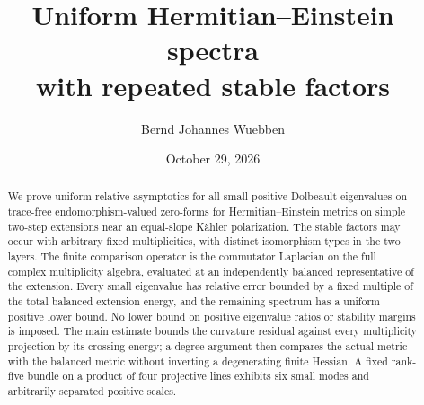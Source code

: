 \documentclass[11pt]{amsart}
\title[HE spectra with repeated stable factors]{Uniform Hermitian--Einstein spectra\\with repeated stable factors}
\author{Bernd Johannes Wuebben}
\date{October 29, 2026}
\theoremstyle{definition}
\theoremstyle{remark}
\begin{document}
\begin{abstract}
We prove uniform relative asymptotics for all small positive Dolbeault
eigenvalues on trace-free endomorphism-valued zero-forms for
Hermitian--Einstein metrics on simple two-step extensions
near an equal-slope Kähler polarization. The stable factors may occur with
arbitrary fixed multiplicities, with distinct isomorphism types in the two
layers. The finite comparison operator is the commutator Laplacian on the
full complex multiplicity algebra, evaluated at an independently balanced
representative of the extension. Every small eigenvalue has relative error
bounded by a fixed multiple of the total balanced extension energy, and the remaining spectrum
has a uniform positive lower bound. No lower bound on positive eigenvalue
ratios or stability margins is imposed. The main estimate bounds the
curvature residual against every multiplicity projection by its crossing
energy; a degree argument then compares the actual metric with the balanced
metric without inverting a degenerating finite Hessian. A fixed rank-five
bundle on a product of four projective lines exhibits six small modes and
arbitrarily separated positive scales.
\end{abstract}
\maketitle








\end{document}
